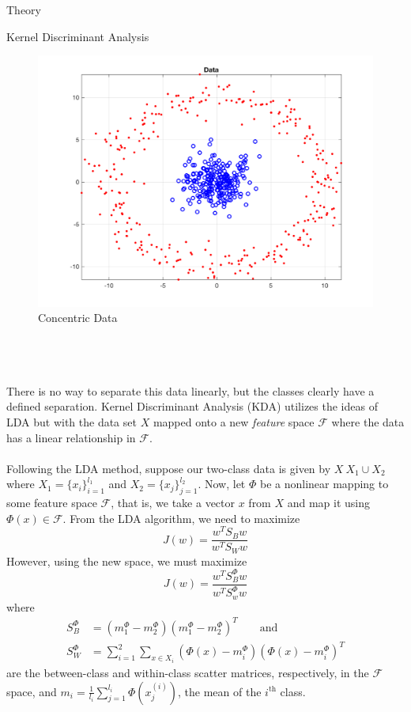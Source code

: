 \begin{section}{Theory}
\begin{subsection}{Kernel Discriminant Analysis}
\begin{minipage}{1.0\textwidth}
    \begin{figure}[H]
    \centering
    \includegraphics[trim={0cm 0cm 0cm 0cm},clip,width=0.8\columnwidth]{kda_test/circles_data}
    \caption{Concentric Data}
    \label{fig:circle_data}
    \end{figure}
\end{minipage}
\\
\\
\\
There is no way to separate this data linearly, but the classes clearly have a defined separation. Kernel Discriminant Analysis (KDA) utilizes the ideas of LDA but with the data set $X$ mapped onto a new \textit{feature} space $\mathcal{F}$ where the data has a linear relationship in $\mathcal{F}$.
\\
\\
Following the LDA method, suppose our two-class data is given by $X \ X_1 \cup X_2$ where $X_1 = \lbrace x_i \rbrace_{i=1}^{l_1}$ and $X_2 = \lbrace x_j \rbrace_{j=1}^{l_2}$. Now, let $\Phi$ be a nonlinear mapping to some feature space $\mathcal{F}$, that is, we take a vector $x$ from $X$ and map it using $\Phi(x) \in \mathcal{F}$. From the LDA algorithm, we need to maximize
$$
	J(w) = \frac{w^T S_B w}{w^T S_W w}
$$
However, using the new space, we must maximize
$$
	J(w) = \frac{w^T S_B^\Phi w}{w^T S_w^\Phi w}
$$
where 
\begin{align*}
	S_B^\Phi &= (m_1^\Phi - m_2^\Phi) (m_1^\Phi - m_2^\Phi)^T \qquad \text{and} \\
	S_W^\Phi &= \sum_{i=1}^2 \sum_{x \in X_i} (\Phi(x) - m_i^\Phi) (\Phi(x) - m_i^\Phi)^T
\end{align*}
are the between-class and within-class scatter matrices, respectively, in the $\mathcal{F}$ space, and $m_i = \frac{1}{l_i} \sum_{j=1}^{l_i} \Phi( x_j^{(i)} )$, the mean of the $i^{\text{th}}$ class.


\end{subsection}
\end{section}

